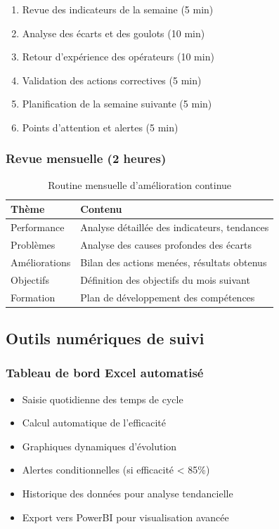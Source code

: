 \documentclass[12pt,a4paper]{article}
\newenvironment{methodbox}[1]
  {\begin{tcolorbox}[colback=blue!5!white, colframe=methodcolor, title=#1]\small}
  {\end{tcolorbox}}
\begin{document}
\begin{methodbox}{Ordre du jour type}
\begin{enumerate}
    \item Revue des indicateurs de la semaine (5 min)
    \item Analyse des écarts et des goulots (10 min)
    \item Retour d'expérience des opérateurs (10 min)
    \item Validation des actions correctives (5 min)
    \item Planification de la semaine suivante (5 min)
    \item Points d'attention et alertes (5 min)
\end{enumerate}
\end{methodbox}

\subsubsection{Revue mensuelle (2 heures)}

\begin{table}[H]
\centering
\begin{tabular}{|p{4cm}|p{8cm}|}
\hline
\textbf{Thème} & \textbf{Contenu} \\
\hline
Performance & Analyse détaillée des indicateurs, tendances \\
\hline
Problèmes & Analyse des causes profondes des écarts \\
\hline
Améliorations & Bilan des actions menées, résultats obtenus \\
\hline
Objectifs & Définition des objectifs du mois suivant \\
\hline
Formation & Plan de développement des compétences \\
\hline
\end{tabular}
\caption{Routine mensuelle d'amélioration continue}
\end{table}

\subsection{Outils numériques de suivi}

\subsubsection{Tableau de bord Excel automatisé}

\begin{methodbox}{Fonctionnalités recommandées}
\begin{itemize}
    \item Saisie quotidienne des temps de cycle
    \item Calcul automatique de l'efficacité
    \item Graphiques dynamiques d'évolution
    \item Alertes conditionnelles (si efficacité < 85\%)
    \item Historique des données pour analyse tendancielle
    \item Export vers PowerBI pour visualisation avancée
\end{itemize}
\end{methodbox}
\end{document}
